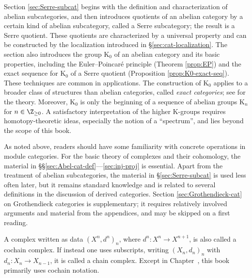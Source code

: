Section \ref{sec:Serre-subcat} begins with the definition and characterization
of abelian subcategories, and then introduces quotients of an abelian category
by a certain kind of abelian subcategory, called a Serre subcategory; the
result is a Serre quotient. These quotients are characterized by a universal
property and can be constructed by the localization introduced in
\S\ref{sec:cat-localization}. The section also introduces the group
$\mathrm{K}_0$ of an abelian category and its basic properties, including the
Euler--Poincar\'e principle (Theorem \ref{prop:EP}) and the exact sequence for
$\mathrm{K}_0$ of a Serre quotient (Proposition
\ref{prop:K0-exact-seq}). These techniques are common in applications. The
construction of $\mathrm{K}_0$ applies to a broader class of structures than
abelian categories, called \emph{exact categories}; see \cite{Bu10} for the
theory. Moreover, $\mathrm{K}_0$ is only the beginning of a sequence of
abelian groups $\mathrm{K}_n$ for $n\in\Z_{\geq0}$. A satisfactory
interpretation of the higher K-groups requires homotopy-theoretic ideas,
especially the notion of a ``spectrum'', and lies beyond the scope of this
book.

\begin{petunjukbacaan}
	As noted above, readers should have some familiarity with concrete
	operations in module categories. For the basic theory of complexes and
	their cohomology, the material in
	\S\S\ref{sec:Abel-cat-def}---\ref{sec:inj-proj} is essential. Apart from
	the treatment of abelian subcategories, the material in
	\S\ref{sec:Serre-subcat} is used less often later, but it remains standard
	knowledge and is related to several definitions in the discussion of
	derived categories. Section \ref{sec:Grothendieck-cat} on Grothendieck
	categories is supplementary; it requires relatively involved arguments
	and material from the appendices, and may be skipped on a first reading.

	A complex written as data $(X^n,d^n)_n$, where
	$d^n:X^n\to X^{n+1}$, is also called a cochain complex. If instead one
	uses subscripts, writing $(X_n,d_n)_n$ with
	$d_n:X_n\to X_{n-1}$, it is called a chain complex. Except in
	Chapter~, this book primarily uses
	cochain notation.
\end{petunjukbacaan}
